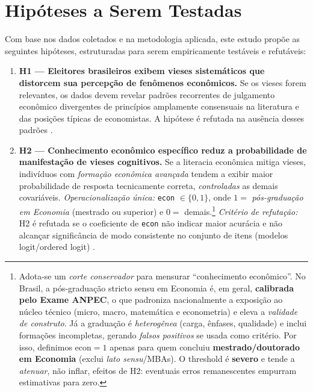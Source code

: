 \section{Hipóteses a Serem Testadas}

Com base nos dados coletados e na metodologia aplicada, este estudo propõe as seguintes hipóteses, estruturadas para serem empiricamente testáveis e refutáveis:

\begin{enumerate}[label=\alph*)]

  \item \textbf{H1 — Eleitores brasileiros exibem vieses sistemáticos que distorcem sua percepção de fenômenos econômicos.} 
  Se os vieses forem relevantes, os dados devem revelar padrões recorrentes de julgamento econômico divergentes de princípios amplamente consensuais na literatura e das posições típicas de economistas. A hipótese é refutada na ausência desses padrões \cite{The_Myth_of_the_Rational_Voter,blendon1997}.

  \item \textbf{H2 — Conhecimento econômico específico reduz a probabilidade de manifestação de vieses cognitivos.} 
  Se a literacia econômica mitiga vieses, indivíduos com \emph{formação econômica avançada} tendem a exibir maior probabilidade de resposta tecnicamente correta, \emph{controladas} as demais covariáveis. 
  \textit{Operacionalização única:} \texttt{econ} $\in\{0,1\}$, onde $1 =$ \emph{pós-graduação em Economia} (mestrado ou superior) e $0 =$ demais.\footnote{Adota-se um \emph{corte conservador} para mensurar “conhecimento econômico”. No Brasil, a pós-graduação stricto sensu em Economia é, em geral, \textbf{calibrada pelo Exame ANPEC}, o que padroniza nacionalmente a exposição ao núcleo técnico (micro, macro, matemática e econometria) e eleva a \emph{validade de construto}. Já a graduação é \emph{heterogênea} (carga, ênfases, qualidade) e inclui formações incompletas, gerando \emph{falsos positivos} se usada como critério. Por isso, definimos $\mathrm{econ}=1$ apenas para quem concluiu \textbf{mestrado/doutorado em Economia} (exclui \emph{lato sensu}/MBAs). O threshold é \textbf{severo} e tende a \emph{atenuar}, não inflar, efeitos de H2: eventuais erros remanescentes empurram estimativas para zero.}
  \textit{Critério de refutação:} H2 é refutada se o coeficiente de \texttt{econ} não indicar maior acurácia e não alcançar significância de modo consistente no conjunto de itens (modelos logit/ordered logit) \cite{downs1957economic,Judgment_under_Uncertainty}.


\end{enumerate}
